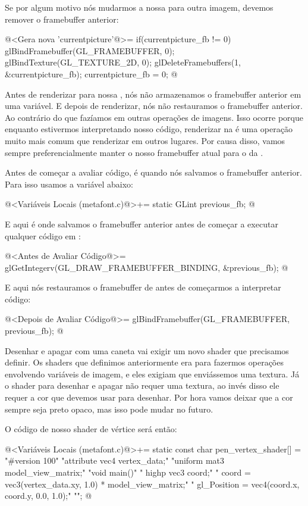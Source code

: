 {Se por algum motivo nós mudarmos a nossa 
para outra imagem, devemos remover o framebuffer anterior:

\iniciocodigo
@<Gera nova 'currentpicture'@>=
{
  if(currentpicture_fb != 0){
    glBindFramebuffer(GL_FRAMEBUFFER, 0);
    glBindTexture(GL_TEXTURE_2D, 0);
    glDeleteFramebuffers(1, &currentpicture_fb);
  }
  currentpicture_fb = 0;
}
@
\fimcodigo

Antes de renderizar para nossa , nós não
armazenamos o framebuffer anterior em uma variável. E depois de
renderizar, nós não restauramos o framebuffer anterior. Ao contrário
do que fazíamos em outras operações de imagens. Isso ocorre porque
enquanto estivermos interpretando nosso código, renderizar
na  é uma operação muito mais comum que
renderizar em outros lugares. Por causa disso, vamos sempre
preferencialmente manter o nosso framebuffer atual para o
da .

Antes de começar a avaliar código, é quando nós salvamos o framebuffer
anterior. Para isso usamos a variável abaixo:

\iniciocodigo
@<Variáveis Locais (metafont.c)@>+=
static GLint previous_fb;
@
\fimcodigo

E aqui é onde salvamos o framebuffer anterior antes de começar a
executar qualquer código em :

\iniciocodigo
@<Antes de Avaliar Código@>=
glGetIntegerv(GL_DRAW_FRAMEBUFFER_BINDING, &previous_fb);
@
\fimcodigo

E aqui nós restauramos o framebuffer de antes de começarmos a
interpretar código:

\iniciocodigo
@<Depois de Avaliar Código@>=
glBindFramebuffer(GL_FRAMEBUFFER, previous_fb);
@
\fimcodigo


Desenhar e apagar com uma caneta vai exigir um novo shader que
precisamos definir. Os shaders que definimos anteriormente era para
fazermos operações envolvendo variáveis de imagem, e eles exigiam que
enviássemos uma textura. Já o shader para desenhar e apagar não requer
uma textura, ao invés disso ele requer a cor que devemos usar para
desenhar. Por hora vamos deixar que a cor sempre seja preto opaco, mas
isso pode mudar no futuro.

O código de nosso shader de vértice será então:

\iniciocodigo
@<Variáveis Locais (metafont.c)@>+=
static const char pen_vertex_shader[] =
  "#version 100\n"
  "attribute vec4 vertex_data;\n"
  "uniform mat3 model_view_matrix;\n"
  "void main(){\n"
  "  highp vec3 coord;\n"
  "  coord = vec3(vertex_data.xy, 1.0) * model_view_matrix;\n"
  "  gl_Position = vec4(coord.x, coord.y, 0.0, 1.0);\n"
  "}\n";
@
\fimcodigo

}
